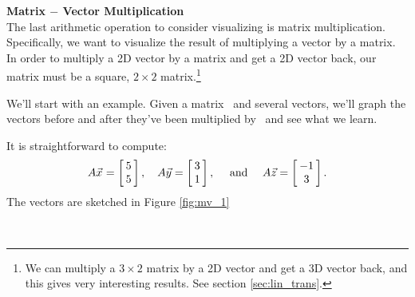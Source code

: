 \noindent \large \textsf{\textbf{Matrix $-$ Vector Multiplication}} \normalsize\\

The last arithmetic operation to consider visualizing is matrix multiplication. Specifically, we want to visualize the result of multiplying a vector by a matrix. In order to multiply a 2D vector by a matrix and get a 2D vector back, our matrix must be a square, $2\times 2$ matrix.\footnote{We can multiply a $3\times 2$ matrix by a 2D vector and get a 3D vector back, and this gives very interesting results. See section \ref{sec:lin_trans}.}

We'll start with an example. Given a matrix \tta\ and several vectors, we'll graph the vectors before and after they've been multiplied by \tta\ and see what we learn.\\

{\begin{myfigure}%
\begin{center}
\end{center}
\label{fig:mv_1}
\end{myfigure}%

It is straightforward to compute: $$\tta\vx = \bmx{c} 5\\5\emx,\quad \tta\vy = \bmx{c} 3\\1\emx, \quad \text{ and } \quad \tta\vz = \bmx{c} -1\\3\emx.$$ The vectors are sketched in Figure \ref{fig:mv_1}
}\\  %

